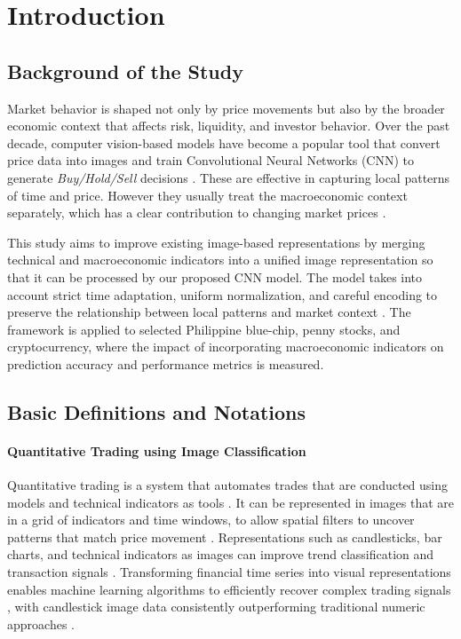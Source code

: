 \chapter{Introduction}\label{chap:intro} 

\section{Background of the Study}

Market behavior is shaped not only by price movements but also by the broader economic context that affects risk, liquidity, and investor behavior. Over the past decade, computer vision-based models have become a popular tool that convert price data into images and train Convolutional Neural Networks (CNN) to generate \textit{Buy/Hold/Sell} decisions \cite{cohen2020trading,sezer2018algorithmic,gudelek2017deep}. These are effective in capturing local patterns of time and price. However they usually treat the macroeconomic context separately, which has a clear contribution to changing market prices \cite{wang2019aggregating,ma2022macroeconomic,chauhan2025exploring}.

This study aims to improve existing image-based representations by merging technical and macroeconomic indicators into a unified image representation so that it can be processed by our proposed CNN model. 
The model takes into account strict time adaptation, uniform normalization, and careful encoding to preserve the relationship between local patterns and market context \cite{sezer2018algorithmic,maratkhan2021deep}. 
The framework is applied to selected Philippine blue-chip, penny stocks, and cryptocurrency, where the impact of incorporating macroeconomic indicators on prediction accuracy and performance metrics is measured.


\section{Basic Definitions and Notations}\label{sec:BasicDefns}
\subsubsection*{Quantitative Trading using Image Classification}
Quantitative trading is a system that automates trades that are conducted using models and technical indicators as tools \cite{ta2018prediction}. It can be represented in images that are in a grid of indicators and time windows, to allow spatial filters to uncover patterns that match price movement \cite{cohen2020trading,sezer2018algorithmic}. Representations such as candlesticks, bar charts, and technical indicators as images can improve trend classification and transaction signals \cite{gudelek2017deep,chen2020encoding,liu2023automated}. Transforming financial time series into visual representations enables machine learning algorithms to efficiently recover complex trading signals \cite{cohen2020trading}, with candlestick image data consistently outperforming traditional numeric approaches \cite{liu2023automated}. 


